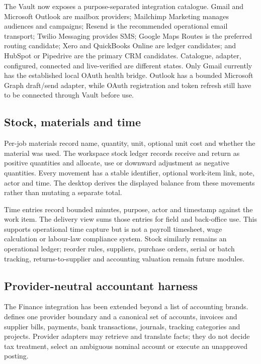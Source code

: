 The Vault now exposes a purpose-separated integration catalogue.  Gmail and
Microsoft Outlook are mailbox providers; Mailchimp Marketing manages audiences
and campaigns; Resend is the recommended operational email transport; Twilio
Messaging provides SMS; Google Maps Routes is the preferred routing candidate;
Xero and QuickBooks Online are ledger candidates; and HubSpot or Pipedrive are
the primary CRM candidates.  Catalogue, adapter, configured, connected and
live-verified are different states.  Only Gmail currently has the established
local OAuth health bridge.  Outlook has a bounded Microsoft Graph draft/send
adapter, while OAuth registration and token refresh still have to be connected
through Vault before use.

\subsection{Stock, materials and time}

Per-job materials record name, quantity, unit, optional unit cost and whether the
material was used.  The workspace stock ledger records receive and return as
positive quantities and allocate, use or downward adjustment as negative
quantities.  Every movement has a stable identifier, optional work-item link,
note, actor and time.  The desktop derives the displayed balance from these
movements rather than mutating a separate total.

Time entries record bounded minutes, purpose, actor and timestamp against the
work item.  The delivery view sums those entries for field and back-office use.
This supports operational time capture but is not a payroll timesheet, wage
calculation or labour-law compliance system.  Stock similarly remains an
operational ledger; reorder rules, suppliers, purchase orders, serial or batch
tracking, returns-to-supplier and accounting valuation remain future modules.

\subsection{Provider-neutral accountant harness}

The Finance integration has been extended beyond a list of accounting brands.
 defines one provider boundary and a
canonical set of accounts, invoices and supplier bills, payments, bank
transactions, journals, tracking categories and projects.  Provider adapters
may retrieve and translate facts; they do not decide tax treatment, select an
ambiguous nominal account or execute an unapproved posting.

